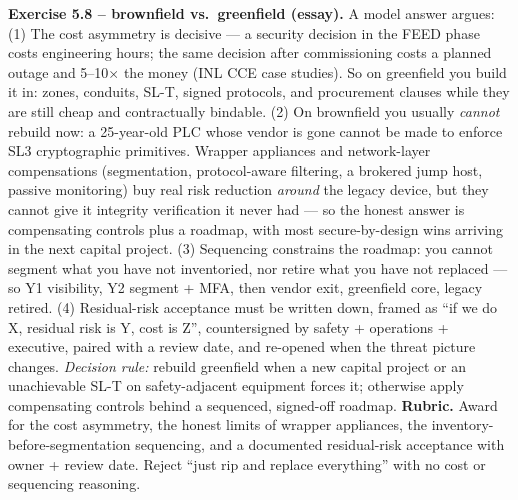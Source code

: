 \documentclass[11pt,a4paper]{article}
\begin{document}
\begin{solutionbox}
\textbf{Exercise 5.8 -- brownfield vs.\ greenfield (essay).}
A model answer argues: (1) The cost asymmetry is decisive --- a security decision in the FEED phase costs engineering hours; the same decision after commissioning costs a planned outage and 5--10$\times$ the money (INL CCE case studies). So on greenfield you build it in: zones, conduits, SL-T, signed protocols, and procurement clauses while they are still cheap and contractually bindable. (2) On brownfield you usually \emph{cannot} rebuild now: a 25-year-old PLC whose vendor is gone cannot be made to enforce SL3 cryptographic primitives. Wrapper appliances and network-layer compensations (segmentation, protocol-aware filtering, a brokered jump host, passive monitoring) buy real risk reduction \emph{around} the legacy device, but they cannot give it integrity verification it never had --- so the honest answer is compensating controls plus a roadmap, with most secure-by-design wins arriving in the next capital project. (3) Sequencing constrains the roadmap: you cannot segment what you have not inventoried, nor retire what you have not replaced --- so Y1 visibility, Y2 segment + MFA, then vendor exit, greenfield core, legacy retired. (4) Residual-risk acceptance must be written down, framed as ``if we do X, residual risk is Y, cost is Z'', countersigned by safety + operations + executive, paired with a review date, and re-opened when the threat picture changes. \emph{Decision rule:} rebuild greenfield when a new capital project or an unachievable SL-T on safety-adjacent equipment forces it; otherwise apply compensating controls behind a sequenced, signed-off roadmap. \textbf{Rubric.} Award for the cost asymmetry, the honest limits of wrapper appliances, the inventory-before-segmentation sequencing, and a documented residual-risk acceptance with owner + review date. Reject ``just rip and replace everything'' with no cost or sequencing reasoning.
\end{solutionbox}
\end{document}
